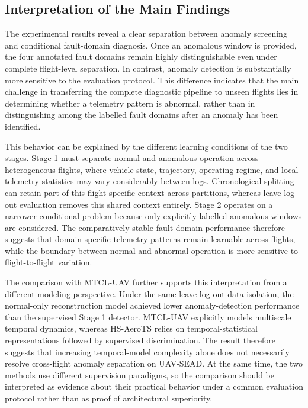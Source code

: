 \subsection{Interpretation of the Main Findings}

The experimental results reveal a clear separation between anomaly screening and conditional fault-domain diagnosis. Once an anomalous window is provided, the four annotated fault domains remain highly distinguishable even under complete flight-level separation. In contrast, anomaly detection is substantially more sensitive to the evaluation protocol. This difference indicates that the main challenge in transferring the complete diagnostic pipeline to unseen flights lies in determining whether a telemetry pattern is abnormal, rather than in distinguishing among the labelled fault domains after an anomaly has been identified.

This behavior can be explained by the different learning conditions of the two stages. Stage 1 must separate normal and anomalous operation across heterogeneous flights, where vehicle state, trajectory, operating regime, and local telemetry statistics may vary considerably between logs. Chronological splitting can retain part of this flight-specific context across partitions, whereas leave-log-out evaluation removes this shared context entirely. Stage 2 operates on a narrower conditional problem because only explicitly labelled anomalous windows are considered. The comparatively stable fault-domain performance therefore suggests that domain-specific telemetry patterns remain learnable across flights, while the boundary between normal and abnormal operation is more sensitive to flight-to-flight variation.

The comparison with MTCL-UAV further supports this interpretation from a different modeling perspective. Under the same leave-log-out data isolation, the normal-only reconstruction model achieved lower anomaly-detection performance than the supervised Stage 1 detector. MTCL-UAV explicitly models multiscale temporal dynamics, whereas HS-AeroTS relies on temporal-statistical representations followed by supervised discrimination. The result therefore suggests that increasing temporal-model complexity alone does not necessarily resolve cross-flight anomaly separation on UAV-SEAD. At the same time, the two methods use different supervision paradigms, so the comparison should be interpreted as evidence about their practical behavior under a common evaluation protocol rather than as proof of architectural superiority.

